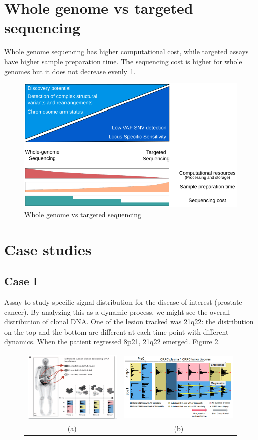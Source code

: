 \section{Whole genome vs targeted sequencing}
Whole genome sequencing has higher computational cost, while targeted assays have higher sample preparation time. The sequencing cost is higher for whole genomes but it does not decrease evenly \ref{fig:wg}.

\begin{figure}[H]
\centering
    \includegraphics[width=0.6\linewidth]{wg.png}
    \caption{\label{fig:wg}Whole genome vs targeted sequencing}
\end{figure}

\section{Case studies}
\subsection{Case I}
Assay to study specific signal distribution for the disease of interest (prostate cancer). By analyzing this as a dynamic process, we might see the overall distribution of clonal DNA.
One of the lesion tracked was 21q22: the distribution on the top and the bottom are different at each time point with different dynamics. When the patient regressed 8p21, 21q22 emerged. Figure \ref{fig:case1}.

\begin{figure}
\begin{tabular}{cc}
  \includegraphics[width=0.4\linewidth]{case1a} &\includegraphics[width=0.6\linewidth]{case1b} \\
(a)  & (b)  \\
\end{tabular}
\caption{}
\label{fig:case1}
\end{figure}

